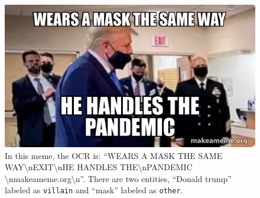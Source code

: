 \begin{figure}[t]
    \centering
    \includegraphics[width=0.8\linewidth]{figures/covid_memes_63.png}
    \caption{In this meme, the OCR is: ``WEARS A MASK THE SAME WAY\textbackslash nEXIT\textbackslash nHE HANDLES THE\textbackslash nPANDEMIC
    \textbackslash nmakeameme.org\textbackslash n''. There are two entities, ``Donald trump'' labeled as \texttt{villain} and ``mask'' labeled as \texttt{other}.}
    \label{fig:meme}
\end{figure}

